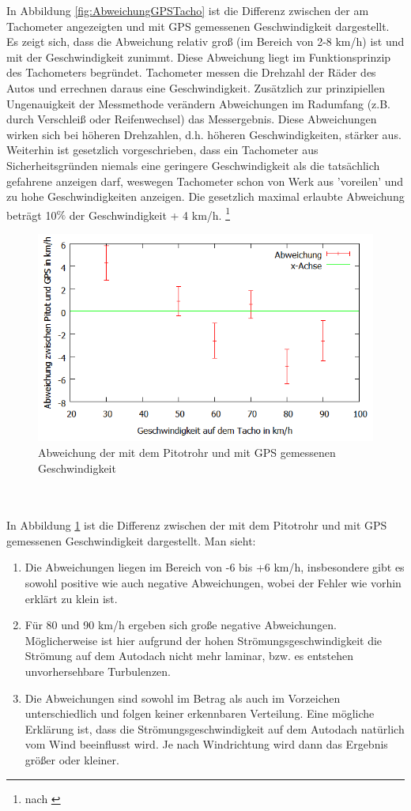 In Abbildung \ref{fig:AbweichungGPSTacho} ist die Differenz zwischen der am Tachometer angezeigten und mit GPS gemessenen Geschwindigkeit dargestellt. Es zeigt sich, dass die Abweichung relativ groß (im Bereich von 2-8 km/h) ist und mit der Geschwindigkeit zunimmt. Diese Abweichung liegt im Funktionsprinzip des Tachometers begründet. Tachometer messen die Drehzahl der Räder des Autos und errechnen daraus eine Geschwindigkeit. Zusätzlich zur prinzipiellen Ungenauigkeit der Messmethode verändern Abweichungen im Radumfang (z.B. durch Verschleiß oder Reifenwechsel) das Messergebnis. Diese Abweichungen wirken sich bei höheren Drehzahlen, d.h. höheren Geschwindigkeiten, stärker aus. Weiterhin ist gesetzlich vorgeschrieben, dass ein Tachometer aus Sicherheitsgründen niemals eine geringere Geschwindigkeit als die tatsächlich gefahrene anzeigen darf, weswegen Tachometer schon von Werk aus 'voreilen' und zu hohe Geschwindigkeiten anzeigen. Die gesetzlich maximal erlaubte Abweichung beträgt 10$\%$ der Geschwindigkeit + 4 km/h.  \footnote{nach \cite{ho}}
\begin{figure}
      \includegraphics[width=.9\textwidth]{images/AbweichungGPSPitot}
\caption{Abweichung der mit dem Pitotrohr und mit GPS gemessenen Geschwindigkeit}
\label{fig:AbweichungGPSPitot}
\end{figure}
\\
\\
In Abbildung \ref{fig:AbweichungGPSPitot} ist die Differenz zwischen der mit dem Pitotrohr und mit GPS gemessenen Geschwindigkeit dargestellt. Man sieht:
\begin{enumerate}
\item Die Abweichungen liegen im Bereich von -6 bis +6 km/h, insbesondere gibt es sowohl positive wie auch negative Abweichungen, wobei der Fehler wie vorhin erklärt zu klein ist.
\item Für 80 und 90 km/h ergeben sich große negative Abweichungen. Möglicherweise ist hier aufgrund der hohen Strömungsgeschwindigkeit die Strömung auf dem Autodach nicht mehr laminar, bzw. es entstehen unvorhersehbare Turbulenzen.
\item Die Abweichungen sind sowohl im Betrag als auch im Vorzeichen unterschiedlich und folgen keiner erkennbaren Verteilung. Eine mögliche Erklärung ist, dass die Strömungsgeschwindigkeit auf dem Autodach natürlich vom Wind beeinflusst wird. Je nach Windrichtung wird dann das Ergebnis größer oder kleiner.
\end{enumerate}
\newpage
